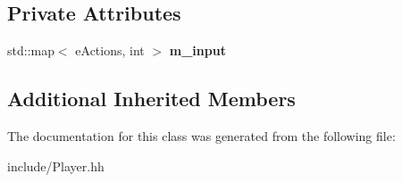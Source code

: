 \subsection*{Private Attributes}
\begin{DoxyCompactItemize}
\item 
\hypertarget{class_player_a501c943f3580f7e990c4eae92bd401bf}{}std\+::map$<$ e\+Actions, int $>$ {\bfseries m\+\_\+input}\label{class_player_a501c943f3580f7e990c4eae92bd401bf}

\end{DoxyCompactItemize}
\subsection*{Additional Inherited Members}


The documentation for this class was generated from the following file\+:\begin{DoxyCompactItemize}
\item 
include/Player.\+hh\end{DoxyCompactItemize}

